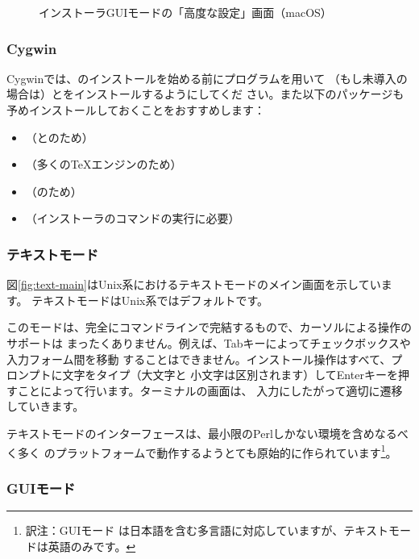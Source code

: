 \documentclass[uplatex,dvipdfmx,12pt,tombow]{jsarticle}
\begin{document}
\begin{figure}[tb]
\caption{\TL インストーラGUIモードの「高度な設定」画面（macOS）}
\label{fig:installer-advanced}
\end{figure}

\subsubsection{Cygwin}
\label{sec:cygwin}

Cygwinでは、\TL のインストールを始める前にプログラムを用いて
（もし未導入の場合は）とをインストールするようにしてくだ
さい。また以下のパッケージも予めインストールしておくことをおすすめします：
%
\begin{itemize}
\item {}（\XeTeX と\LuaTeX のため）
\item {}（多くの\TeX エンジンのため）
\item {}（のため）
\item {}（インストーラのコマンドの実行に必要）
\end{itemize}

\subsubsection{テキストモード}

図\ref{fig:text-main}はUnix系におけるテキストモードのメイン画面を示しています。
テキストモードはUnix系ではデフォルトです。

このモードは、完全にコマンドラインで完結するもので、カーソルによる操作のサポートは
まったくありません。例えば、Tabキーによってチェックボックスや入力フォーム間を移動
することはできません。インストール操作はすべて、プロンプトに文字をタイプ（大文字と
小文字は区別されます）してEnterキーを押すことによって行います。ターミナルの画面は、
入力にしたがって適切に遷移していきます。

テキストモードのインターフェースは、最小限のPerlしかない環境を含めなるべく多く
のプラットフォームで動作するようとても原始的に作られています\footnote{訳注：GUIモード
は日本語を含む多言語に対応していますが、テキストモードは英語のみです。}。

\subsubsection{GUIモード}
\label{sec:graphical-inst}
\end{document}
